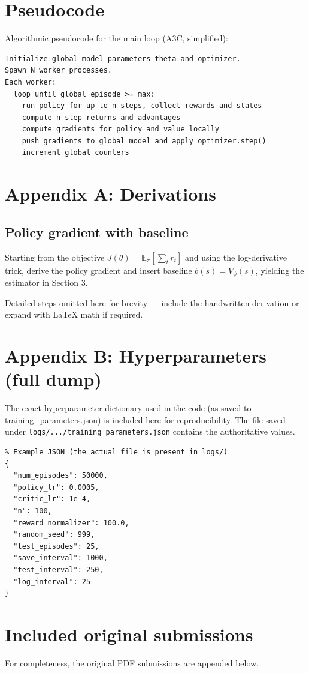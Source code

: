 \documentclass[11pt]{article}
\begin{document}
\section{Pseudocode}
Algorithmic pseudocode for the main loop (A3C, simplified):

\begin{verbatim}
Initialize global model parameters theta and optimizer.
Spawn N worker processes.
Each worker:
  loop until global_episode >= max:
    run policy for up to n steps, collect rewards and states
    compute n-step returns and advantages
    compute gradients for policy and value locally
    push gradients to global model and apply optimizer.step()
    increment global counters
\end{verbatim}

\section{Appendix A: Derivations}
\subsection{Policy gradient with baseline}
Starting from the objective \(J(\theta)=\mathbb{E}_\pi\left[ \sum_t r_t \right]\) and using the log-derivative trick, derive the policy gradient and insert baseline \(b(s)=V_\phi(s)\), yielding the estimator in Section 3.

Detailed steps omitted here for brevity — include the handwritten derivation or expand with LaTeX math if required.

\section{Appendix B: Hyperparameters (full dump)}
The exact hyperparameter dictionary used in the code (as saved to training\_parameters.json) is included here for reproducibility. The file saved under \texttt{logs/.../training\_parameters.json} contains the authoritative values.

\begin{verbatim}
% Example JSON (the actual file is present in logs/)
{
  "num_episodes": 50000,
  "policy_lr": 0.0005,
  "critic_lr": 1e-4,
  "n": 100,
  "reward_normalizer": 100.0,
  "random_seed": 999,
  "test_episodes": 25,
  "save_interval": 1000,
  "test_interval": 250,
  "log_interval": 25
}
\end{verbatim}

\section{Included original submissions}
For completeness, the original PDF submissions are appended below.
\bigskip


\end{document}
